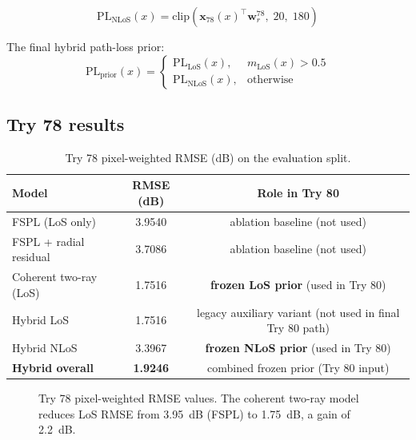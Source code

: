 \begin{equation}
\mathrm{PL}_{\mathrm{NLoS}}(x) = \mathrm{clip}\!\left(\textbf{x}_{78}(x)^\top \textbf{w}^{78}_{r},\;20,\;180\right)
\label{eq:pl_nlos_final}
\end{equation}

The final hybrid path-loss prior:
\begin{equation}
\mathrm{PL}_{\mathrm{prior}}(x) = \begin{cases} \mathrm{PL}_{\mathrm{LoS}}(x), & m_{\mathrm{LoS}}(x) > 0.5 \\ \mathrm{PL}_{\mathrm{NLoS}}(x), & \text{otherwise} \end{cases}
\label{eq:pl_hybrid}
\end{equation}

\subsection{Try 78 results}

\begin{table}[H]
\centering
\caption{Try 78 pixel-weighted RMSE (dB) on the evaluation split.}
\label{tab:try78_rmse}
\begin{tabular}{lcc}
\toprule
Model & RMSE (dB) & Role in Try 80\\
\midrule
FSPL (LoS only)            & 3.9540 & ablation baseline (not used)\\
FSPL + radial residual     & 3.7086 & ablation baseline (not used)\\
Coherent two-ray (LoS)     & 1.7516 & \textbf{frozen LoS prior} (used in Try 80)\\
Hybrid LoS                 & 1.7516 & legacy auxiliary variant (not used in final Try 80 path)\\
Hybrid NLoS                & 3.3967 & \textbf{frozen NLoS prior} (used in Try 80)\\
\midrule
\textbf{Hybrid overall}    & \textbf{1.9246} & combined frozen prior (Try 80 input)\\
\bottomrule
\end{tabular}
\end{table}

\begin{figure}[H]
\centering
{}
\caption{Try 78 pixel-weighted RMSE values. The coherent two-ray model reduces LoS RMSE from 3.95~dB (FSPL) to 1.75~dB, a gain of 2.2~dB.}
\label{fig:try78_rmse}
\end{figure}

